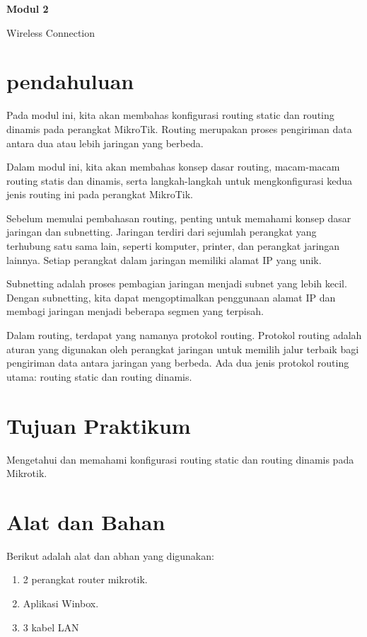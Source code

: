 \newpage
\setcounter{section}{0}
\renewcommand{\thesection}{\arabic{section}}

\begin{center}
    \Huge
    \textbf{Modul 2}
    
    Wireless Connection

\end{center}


\section{pendahuluan}

Pada modul ini, kita akan membahas konfigurasi routing static dan routing dinamis pada perangkat
MikroTik. Routing merupakan proses pengiriman data antara dua atau lebih jaringan yang berbeda.

Dalam modul ini, kita akan membahas konsep dasar routing, macam-macam routing statis dan
dinamis, serta langkah-langkah untuk mengkonfigurasi kedua jenis routing ini pada perangkat
MikroTik.

Sebelum memulai pembahasan routing, penting untuk memahami konsep dasar jaringan dan
subnetting. Jaringan terdiri dari sejumlah perangkat yang terhubung satu sama lain, seperti komputer,
printer, dan perangkat jaringan lainnya. Setiap perangkat dalam jaringan memiliki alamat IP yang
unik.

Subnetting adalah proses pembagian jaringan menjadi subnet yang lebih kecil. Dengan subnetting, kita
dapat mengoptimalkan penggunaan alamat IP dan membagi jaringan menjadi beberapa segmen yang
terpisah.

Dalam routing, terdapat yang namanya protokol routing. Protokol routing adalah aturan yang
digunakan oleh perangkat jaringan untuk memilih jalur terbaik bagi pengiriman data antara jaringan
yang berbeda. Ada dua jenis protokol routing utama: routing static dan routing dinamis.

\section{Tujuan Praktikum}

Mengetahui dan memahami konfigurasi routing static dan routing dinamis pada Mikrotik.

\section{Alat dan Bahan}

Berikut adalah alat dan abhan yang digunakan:
\begin{enumerate}
    \item 2 perangkat router mikrotik.
    \item Aplikasi Winbox.
    \item 3 kabel LAN
\end{enumerate}

